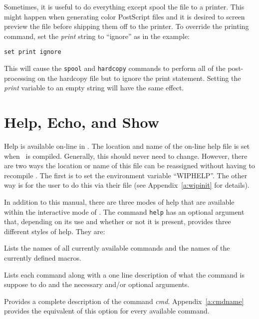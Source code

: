 Sometimes, it is useful to do everything except spool the file to a
printer.  This might happen when generating color PostScript files
and it is desired to screen preview the file before shipping them off to
the printer.
To override the printing command, set the {\em print} string to ``ignore''
as in the example:
\begin{wiplist}%
  \item {\tt set print ignore}
\end{wiplist}
This will cause the {\tt spool} and {\tt hardcopy} commands to perform
all of the post-processing on the hardcopy file but to ignore the print
statement.
Setting the {\em print} variable to an empty string will
have the same effect.

\section{Help, Echo, and Show}

Help is available on-line in \wip.
The location and name of the on-line help file is set when \wip\ is compiled.
Generally, this should never need to change.
However, there are two ways the location or name of this file can
be reassigned without having to recompile \wip.
The first is to set the environment variable
``WIPHELP''.
The other way is for the user to do this via their \wipinit file
(see Appendix~\ref{a:wipinit} for details).

In addition to this manual, there are three modes of help
that are available within the interactive mode of \wip.
The command {\tt help} has an optional argument that, depending on its
use and whether or not it is present, provides three different styles of help.
They are:
\begin{description}
  \item [{help ? --}] Lists the names of all currently available
\samepage
    commands and the names of the currently defined macros.
  \item [{help --}] Lists each command along with a one line
    description of what the command is suppose to do and the
    necessary and/or optional arguments.
  \item [{help {\em cmd} --}] Provides a complete description of the 
    command {\em cmd}.  Appendix~\ref{a:cmdname} provides the
    equivalent of this option for every available command.
  \end{description}

